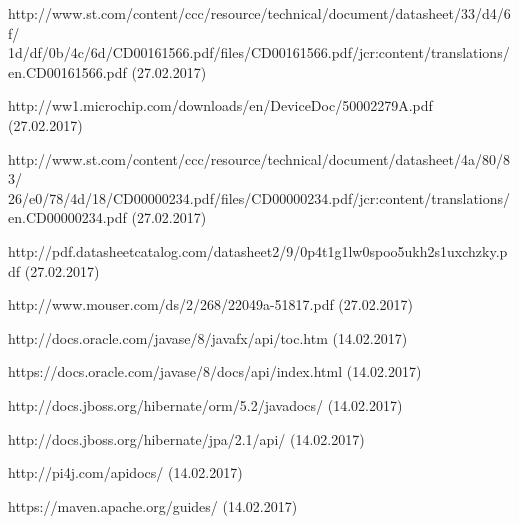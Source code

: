 \documentclass[12pt]{article} %
\numberwithin{equation}{subsection}
\numberwithin{figure}{section}
\numberwithin{table}{section}
\begin{document}
\begin{thebibliography}{99}
		http://www.st.com/content/ccc/resource/technical/document/datasheet/33/d4/6f/
		1d/df/0b/4c/6d/CD00161566.pdf/files/CD00161566.pdf/jcr:content/translations/
		en.CD00161566.pdf (27.02.2017)
		
		http://ww1.microchip.com/downloads/en/DeviceDoc/50002279A.pdf (27.02.2017)
		
		http://www.st.com/content/ccc/resource/technical/document/datasheet/4a/80/83/
		26/e0/78/4d/18/CD00000234.pdf/files/CD00000234.pdf/jcr:content/translations/
		en.CD00000234.pdf (27.02.2017)
		
		http://pdf.datasheetcatalog.com/datasheet2/9/0p4t1g1lw0spoo5ukh2s1uxchzky.pdf (27.02.2017)
		
		http://www.mouser.com/ds/2/268/22049a-51817.pdf (27.02.2017)
		
		http://docs.oracle.com/javase/8/javafx/api/toc.htm (14.02.2017)
		
		https://docs.oracle.com/javase/8/docs/api/index.html (14.02.2017)
		
		http://docs.jboss.org/hibernate/orm/5.2/javadocs/ (14.02.2017)
		
		http://docs.jboss.org/hibernate/jpa/2.1/api/ (14.02.2017)
		
		http://pi4j.com/apidocs/ (14.02.2017)
		
		https://maven.apache.org/guides/ (14.02.2017)
		

\end{thebibliography}
	\newpage

	\listoffigures{}
	\newpage

	\listoftables
	\newpage
\end{document}
